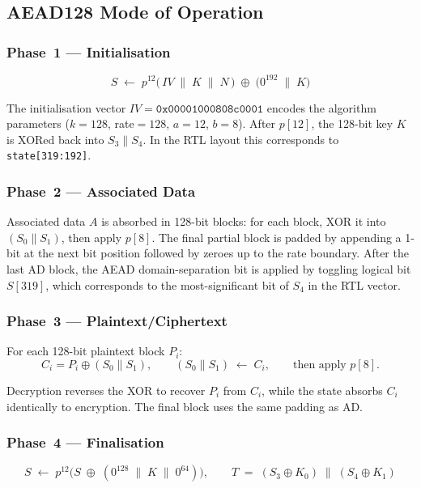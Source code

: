 \documentclass[11pt,a4paper]{article}
\begin{document}
\subsection{AEAD128 Mode of Operation}

\subsubsection*{Phase~1 --- Initialisation}

\[
  S \;\leftarrow\; p^{12}\!\bigl(\,IV \;\|\; K \;\|\; N\,\bigr)
  \;\oplus\; \bigl(0^{192} \;\|\; K\bigr)
\]

The initialisation vector $IV = \texttt{0x00001000808c0001}$ encodes the
algorithm parameters ($k{=}128$, rate${=}128$, $a{=}12$, $b{=}8$).
After $p[12]$, the 128-bit key $K$ is XORed back into $S_3 \| S_4$. In the
RTL layout this corresponds to \texttt{state[319:192]}.

\subsubsection*{Phase~2 --- Associated Data}

Associated data $A$ is absorbed in 128-bit blocks:
for each block, XOR it into $(S_0 \| S_1)$, then apply $p[8]$.
The final partial block is padded by appending a 1-bit at the next bit position
followed by zeroes up to the rate boundary. After the last AD block, the
AEAD domain-separation bit is applied by toggling logical bit $S[319]$, which
corresponds to the most-significant bit of $S_4$ in the RTL vector.

\subsubsection*{Phase~3 --- Plaintext/Ciphertext}

For each 128-bit plaintext block $P_i$:
\[
  C_i = P_i \oplus (S_0 \| S_1),
  \qquad
  (S_0 \| S_1) \;\leftarrow\; C_i,
  \qquad\text{then apply }p[8].
\]

Decryption reverses the XOR to recover $P_i$ from $C_i$, while the state
absorbs $C_i$ identically to encryption. The final block uses the same
padding as AD.

\subsubsection*{Phase~4 --- Finalisation}

\[
  S \;\leftarrow\; p^{12}\!\bigl(S \;\oplus\; (0^{128} \;\|\; K \;\|\; 0^{64})\bigr),
  \qquad
  T \;=\; (S_3 \oplus K_0) \;\|\; (S_4 \oplus K_1)
\]
\end{document}
